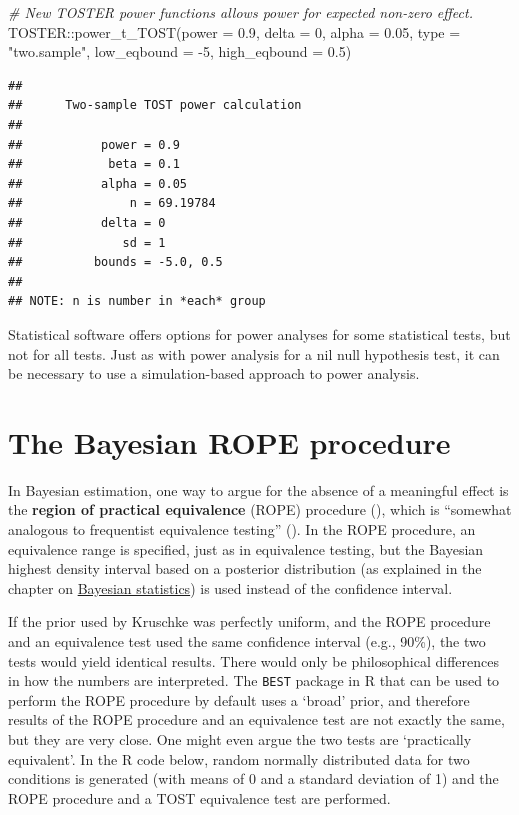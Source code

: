 \documentclass[
  oneside]{krantz}
\makeatletter
\newenvironment{Shaded}{\begin{snugshade}}{\end{snugshade}}
\newcommand{\AttributeTok}[1]{\textcolor[rgb]{0.61,0.61,0.61}{#1}}
\newcommand{\CommentTok}[1]{\textcolor[rgb]{0.37,0.37,0.37}{\textit{#1}}}
\newcommand{\DecValTok}[1]{\textcolor[rgb]{0.06,0.06,0.06}{#1}}
\newcommand{\FloatTok}[1]{\textcolor[rgb]{0.06,0.06,0.06}{#1}}
\newcommand{\FunctionTok}[1]{\textcolor[rgb]{0,0,0}{#1}}
\newcommand{\NormalTok}[1]{#1}
\newcommand{\SpecialCharTok}[1]{\textcolor[rgb]{0,0,0}{#1}}
\newcommand{\StringTok}[1]{\textcolor[rgb]{0.5,0.5,0.5}{#1}}
\newenvironment{kframe}{%
\medskip{}
\setlength{\fboxsep}{.8em}
 \def\at@end@of@kframe{}%
 \ifinner\ifhmode%
  \def\at@end@of@kframe{\end{minipage}}%
  \begin{minipage}{\columnwidth}%
 \fi\fi%
 \def\FrameCommand##1{\hskip\@totalleftmargin \hskip-\fboxsep
 \colorbox{shadecolor}{##1}\hskip-\fboxsep
     \hskip-\linewidth \hskip-\@totalleftmargin \hskip\columnwidth}%
 \MakeFramed {\advance\hsize-\width
   \@totalleftmargin\z@ \linewidth\hsize
   \@setminipage}}%
 {\par\unskip\endMakeFramed%
 \at@end@of@kframe}
\renewenvironment{Shaded}{\begin{kframe}}{\end{kframe}}
\makeatother
\begin{document}
\begin{Shaded}
\begin{Highlighting}[]
\CommentTok{\# New TOSTER power functions allows power for expected non{-}zero effect.}
\NormalTok{TOSTER}\SpecialCharTok{::}\FunctionTok{power\_t\_TOST}\NormalTok{(}\AttributeTok{power =} \FloatTok{0.9}\NormalTok{, }\AttributeTok{delta =} \DecValTok{0}\NormalTok{,}
                     \AttributeTok{alpha =} \FloatTok{0.05}\NormalTok{, }\AttributeTok{type =} \StringTok{"two.sample"}\NormalTok{,}
                     \AttributeTok{low\_eqbound =} \SpecialCharTok{{-}}\DecValTok{5}\NormalTok{, }\AttributeTok{high\_eqbound =} \FloatTok{0.5}\NormalTok{)}
\end{Highlighting}
\end{Shaded}

\begin{verbatim}
## 
##      Two-sample TOST power calculation 
## 
##           power = 0.9
##            beta = 0.1
##           alpha = 0.05
##               n = 69.19784
##           delta = 0
##              sd = 1
##          bounds = -5.0, 0.5
## 
## NOTE: n is number in *each* group
\end{verbatim}

Statistical software offers options for power analyses for some statistical tests, but not for all tests. Just as with power analysis for a nil null hypothesis test, it can be necessary to use a simulation-based approach to power analysis.

\hypertarget{ROPE}{%
\section{The Bayesian ROPE procedure}\label{ROPE}}

In Bayesian estimation, one way to argue for the absence of a meaningful effect is the \textbf{region of practical equivalence} (ROPE) procedure (\citet{kruschke_bayesian_2013}), which is ``somewhat analogous to frequentist equivalence testing'' (\citet{kruschke_bayesian_2017}). In the ROPE procedure, an equivalence range is specified, just as in equivalence testing, but the Bayesian highest density interval based on a posterior distribution (as explained in the chapter on \protect\hyperlink{bayes}{Bayesian statistics}) is used instead of the confidence interval.

If the prior used by Kruschke was perfectly uniform, and the ROPE procedure and an equivalence test used the same confidence interval (e.g., 90\%), the two tests would yield identical results. There would only be philosophical differences in how the numbers are interpreted. The \texttt{BEST} package in R that can be used to perform the ROPE procedure by default uses a `broad' prior, and therefore results of the ROPE procedure and an equivalence test are not exactly the same, but they are very close. One might even argue the two tests are `practically equivalent'. In the R code below, random normally distributed data for two conditions is generated (with means of 0 and a standard deviation of 1) and the ROPE procedure and a TOST equivalence test are performed.
\end{document}

